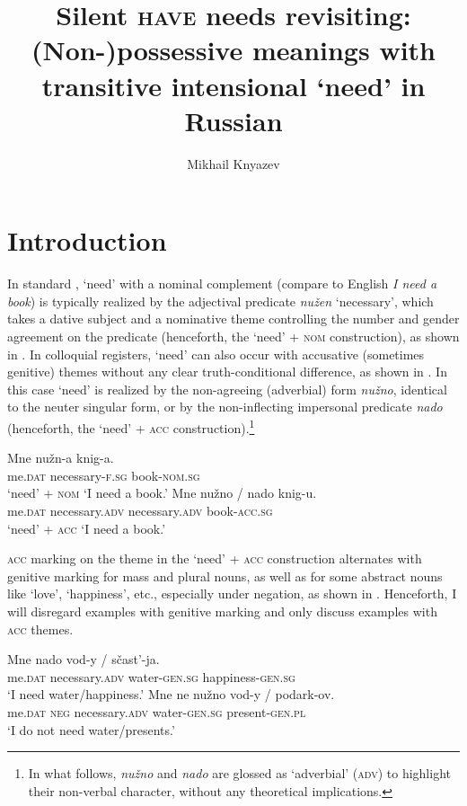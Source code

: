 \documentclass[output=paper,colorlinks,citecolor=brown]{langscibook}
\author{Mikhail Knyazev\affiliation{Institute for Linguistic Studies RAS, Saint Petersburg}\affiliation{National Research University Higher School of Economics, Saint Petersburg}\orcid{0000-0003-4652-4144}}
\title{Silent \textsc{have} needs revisiting: (Non-)possessive meanings with transitive intensional `need' in Russian}
\begin{document}
\maketitle

\section{Introduction}\label{section-intro}

In standard , `need' with a nominal complement (compare to English \textit{I need a book}) is typically realized by the adjectival predicate \textit{nužen} `necessary', which takes a dative subject and a nominative theme controlling the number and gender agreement on the predicate (henceforth, the `need' + \textsc{nom} construction), as shown in . In colloquial registers, `need' can also occur with accusative (sometimes genitive) themes without any clear truth-conditional difference, as shown in . In this case `need' is realized by the non-agreeing (adverbial) form \textit{nužno}, identical to the neuter singular form, or by the non-inflecting impersonal predicate \textit{nado} (henceforth, the `need' + \textsc{acc} construction).\footnote{In what follows, \textit{nužno} and \textit{nado} are glossed as `adverbial' (\textsc{adv}) to highlight their non-verbal character, without any theoretical implications.}

\ea
\ea \gll Mne nužn-a knig-a.\\
     me.\textsc{dat} necessary-\textsc{f.sg} book-\textsc{nom.sg}\\ \hfill `need' + \textsc{nom}
\glt `I need a book.'\label{need-nom}
\ex \gll Mne nužno / nado knig-u.\\
     me.\textsc{dat} necessary.\textsc{adv} {} necessary.\textsc{adv} book-\textsc{acc.sg}\\ \hfill `need' + \textsc{acc}
\glt `I need a book.'\label{need-acc}
\z \z

\noindent \textsc{acc} marking on the theme in the `need' + \textsc{acc} construction alternates with genitive marking for mass and plural nouns, as well as for some abstract nouns like `love', `happiness', etc., especially under negation, as shown in . Henceforth, I will disregard examples with genitive marking and only discuss examples with \textsc{acc} themes.

\ea\label{need-gen}
\ea \gll Mne nado vod-y / sčast'-ja.\\
     me.\textsc{dat} necessary.\textsc{adv} water-\textsc{gen.sg} {} happiness-\textsc{gen.sg}\\
\glt `I need water/happiness.'
\ex \gll Mne ne nužno vod-y / podark-ov.\\
     me.\textsc{dat} \textsc{neg} necessary.\textsc{adv} water-\textsc{gen.sg}  {} present-\textsc{gen.pl}\\
\glt `I do not need water/presents.'
\z\z
\end{document}
